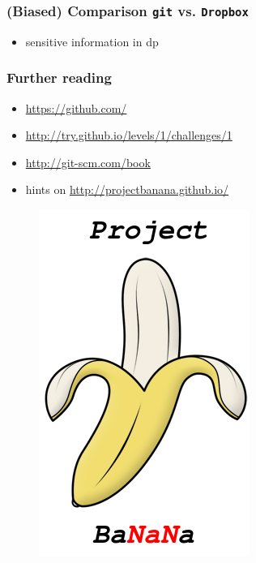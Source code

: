 \documentclass{beamer}
\begin{document}
\begin{frame}
\frametitle{(Biased) Comparison \texttt{git} vs. \texttt{Dropbox}}
\begin{itemize}
 \item sensitive information in dp
\end{itemize}
\end{frame}
\begin{frame}
\frametitle{Further reading}
\begin{itemize}
 \item \url{https://github.com/}
 \item \url{http://try.github.io/levels/1/challenges/1}
 \item \url{http://git-scm.com/book}
 \item hints on \url{http://projectbanana.github.io/}
\end{itemize}
\begin{figure}
\centering
 \includegraphics[height=0.4\textheight]{../../images/logo}
\end{figure}

\end{frame}
\end{document}
